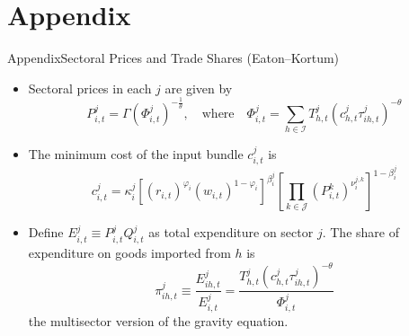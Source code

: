 \documentclass[10pt]{beamer}
\newcommand{\itms}{\itemsep5pt}
\newcommand{\apback}[1]{%
  \vfill\raggedleft\hyperlink{#1}{\structure{\tiny$\blacktriangleleft$\,back}}}
\begin{document}
\section*{Appendix}
\begin{frame}{Appendix}{Sectoral Prices and Trade Shares (Eaton--Kortum)}\label{ap:ek}
  \begin{itemize}\itms
    \item {} Sectoral prices in each $j$ are given by
      \begin{equation*}
        P^j_{i,t} = \Gamma \left(\Phi^j_{i,t}\right)^{-\frac{1}{\theta}},
        \quad \text{where} \quad
        \Phi^j_{i,t} = \sum_{h \in \mathcal{I}} T^j_{h,t}
        \left(c^j_{h,t} \tau^j_{ih,t}\right)^{-\theta}
      \end{equation*}
    \item {} The minimum cost of the input bundle $c^j_{i,t}$ is
      \begin{equation*}
        c^j_{i,t} = \kappa^j_i
        \left[ \left(r_{i,t}\right)^{\varphi_i} \left(w_{i,t}\right)^{1-\varphi_i} \right]^{\beta^j_i}
        \left[ \prod_{k \in \mathcal{J}} \left(P^k_{i,t}\right)^{\nu^{j,k}_i} \right]^{1-\beta^j_i}
      \end{equation*}
    \item {} Define $E^j_{i,t} \equiv P^j_{i,t} Q^j_{i,t}$ as
      total expenditure on sector $j$. The share of expenditure on goods imported from $h$ is
      \begin{equation*}
        \pi^j_{ih,t} \equiv \frac{E^j_{ih,t}}{E^j_{i,t}}
        = \frac{T^j_{h,t} \left(c^j_{h,t} \tau^j_{ih,t}\right)^{-\theta}}{\Phi^j_{i,t}}
      \end{equation*}
      the multisector version of the gravity equation.
  \end{itemize}
  \apback{fr:meth}
\end{frame}
\end{document}
